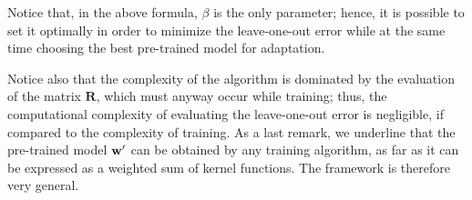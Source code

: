 Notice that, in the above formula, $\beta$ is the only parameter; hence,
it is possible to set it optimally in order to minimize the leave-one-out error
while at the same time choosing the best pre-trained model for adaptation.

Notice also that the complexity of the algorithm is dominated by the evaluation
of the matrix $\boldsymbol{R}$, which must anyway occur while training; thus,
the computational complexity of evaluating the leave-one-out error is negligible, if
compared to the complexity of training. As a last remark,
we underline that the pre-trained model $\mathbf{w}'$ can be
obtained by any training algorithm, as far as it can be expressed as a
weighted sum of kernel functions.  The framework is therefore very
general.
